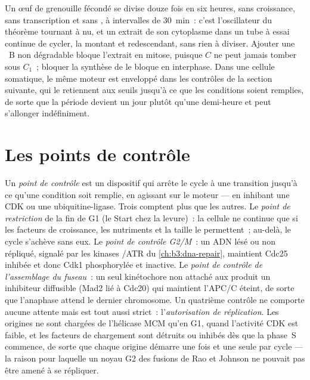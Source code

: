 \begin{example}\label{ex:b3:cell-cycle-apoptosis:frog}
Un œuf de grenouille fécondé se divise douze fois en six heures, sans
croissance, sans transcription et sans , à
intervalles de \qty{30}{min}~: c'est l'oscillateur du théorème tournant
à nu, et un extrait de son cytoplasme dans un tube à essai continue de
cycler, la  montant et redescendant, sans rien à diviser.
Ajouter une ~B non dégradable bloque l'extrait en mitose,
puisque $C$ ne peut jamais tomber sous $C_{1}$~; bloquer la synthèse de
 le bloque en interphase. Dans une cellule somatique, le même
moteur est enveloppé dans les contrôles de la section suivante, qui le
retiennent aux seuils jusqu'à ce que les conditions soient remplies, de
sorte que la période devient un jour plutôt qu'une demi-heure et peut
s'allonger indéfiniment.
\end{example}

\section{Les points de contrôle}

\begin{definition}\label{def:b3:cell-cycle-apoptosis:checkpoints}
Un \emph{point de contrôle} est un dispositif qui arrête le cycle à une
transition jusqu'à ce qu'une condition soit remplie, en agissant sur le
moteur --- en inhibant une CDK ou une ubiquitine-ligase. Trois comptent
plus que les autres. Le \emph{point de restriction} de la fin de G1 (le
Start chez la levure)~: la cellule ne continue que si les facteurs de
croissance, les nutriments et la taille le permettent~; au-delà, le
cycle s'achève sans eux. Le \emph{point de contrôle G2/M}~: un ADN lésé
ou non répliqué, signalé par les kinases /ATR du
\cref{ch:b3:dna-repair}, maintient Cdc25 inhibée et donc Cdk1
phosphorylée et inactive. Le \emph{point de contrôle de l'assemblage du
fuseau}~: un seul kinétochore non attaché aux  produit un
inhibiteur diffusible (Mad2 lié à Cdc20) qui maintient l'APC/C éteint,
de sorte que l'anaphase attend le dernier chromosome. Un quatrième
contrôle ne comporte aucune attente mais est tout aussi strict~:
l'\emph{autorisation de réplication}. Les origines ne sont chargées de
l'hélicase MCM qu'en G1, quand l'activité CDK est faible, et les
facteurs de chargement sont détruits ou inhibés dès que la phase~S
commence, de sorte que chaque origine démarre une fois et une seule par
cycle --- la raison pour laquelle un noyau G2 des fusions de Rao et
Johnson ne pouvait pas être amené à se répliquer.
\end{definition}

